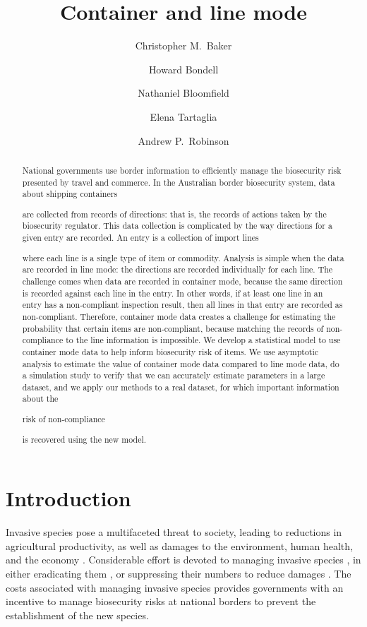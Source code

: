 \documentclass{article}
\title{Container and line mode}
\author{Christopher M.\ Baker \and Howard Bondell \and Nathaniel Bloomfield \and Elena Tartaglia \and Andrew P.\ Robinson}
\newif\ifproofread
\newcommand{\rev}[1]{%
\ifproofread
\hl{#1}%
\else
#1%
\fi
}
\begin{document}


\maketitle
\begin{abstract}
National governments use border information to efficiently manage the biosecurity risk presented by travel and commerce. In the Australian border biosecurity system, data about shipping containers \rev{are collected from records of directions: that is, the records of actions taken by the biosecurity regulator. This data collection is complicated by the way directions for a given entry are recorded. An entry is a collection of import lines} where each line is a single type of item or commodity. Analysis is simple when the data are recorded in line mode: the directions are recorded individually for each line. The challenge comes when data are recorded in container mode, because the same direction is recorded against each line in the entry. In other words, if at least one line in an entry has a non-compliant inspection result, then all lines in that entry are recorded as non-compliant. Therefore, container mode data creates a challenge for estimating the probability that certain items are non-compliant, because matching the records of non-compliance to the line information is impossible. We develop a statistical model to use container mode data to help inform biosecurity risk of items. We use asymptotic analysis to estimate the value of container mode data compared to line mode data, do a simulation study to verify that we can accurately estimate parameters in a large dataset, and we apply our methods to a real dataset, for which important information about the \rev{risk of non-compliance} is recovered using the new model. 
\end{abstract}

\section{Introduction}

Invasive species pose a multifaceted threat to society, leading to reductions in agricultural productivity, as well as damages to the environment, human health, and the economy \citep{kumar_rai_invasive_2020}. Considerable effort is devoted to managing invasive species \citep{jardine_estimating_2018}, in either eradicating them \citep{baker_recent_2020,holmes_globally_2019, wenger_estimating_2017,helmstedt_prioritizing_2016}, or suppressing their numbers to reduce damages \citep{binny_long-term_2021,brook_effects_2012,sharov_slow_2002}. The costs associated with managing invasive species provides governments with an incentive to manage biosecurity risks at national borders to prevent the establishment of the new species. 
\end{document}
